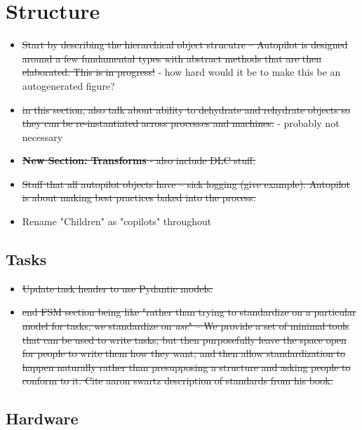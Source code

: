 \section{Structure}


\begin{itemize}
\item \sout{Start by describing the hierarchical object strucutre -- Autopilot is designed around a few fundamental types with abstract methods that are then elaborated. This is in progress!} - how hard would it be to make this be an autogenerated figure?
\item \sout{in this section, also talk about ability to dehydrate and rehydrate objects so they can be re-instantiated across processes and machines.} - probably not necessary
\item \sout{\textbf{New Section: Transforms} - also include DLC stuff.}
\item \sout{Stuff that all autopilot objects have -- sick logging (give example). Autopilot is about making best practices baked into the process. }
\item Rename "Children" as "copilots" throughout
\end{itemize}



\subsection{Tasks}

\begin{itemize}
\item \sout{Update task header to use Pydantic models.}
\item \sout{end FSM section being like "rather than trying to standardize on a particular model for tasks, we standardize on \textit{use}" -- We provide a set of minimal tools that can be used to write tasks, but then purposefully leave the space open for people to write them how they want, and then allow standardization to happen naturally rather than presupposing a structure and asking people to conform to it. Cite aaron swartz description of standards from his book.}
\end{itemize}

\subsection{Hardware}


